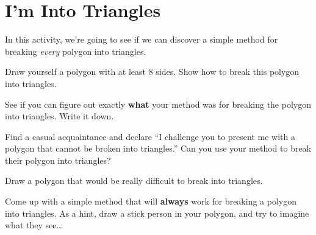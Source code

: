 \newpage
\section{I'm Into Triangles}

In this activity, we're going to see if we can discover a simple
method for breaking \textit{every} polygon into triangles.

\begin{prob}
Draw yourself a polygon with at least 8 sides. Show how to break this
polygon into triangles.
\end{prob}

\begin{prob}
See if you can figure out exactly \textbf{what} your method was for
breaking the polygon into triangles. Write it down. 
\end{prob}

\begin{prob}
Find a casual acquaintance and declare ``I challenge you to present me
with a polygon that cannot be broken into triangles.'' Can you use
your method to break their polygon into triangles?
\end{prob}

\begin{prob}
Draw a polygon that would be really difficult to break into triangles.
\end{prob}

\begin{prob}
Come up with a simple method that will \textbf{always} work for
breaking a polygon into triangles. As a hint, draw a stick person in
your polygon, and try to imagine what they see\dots
\end{prob}


